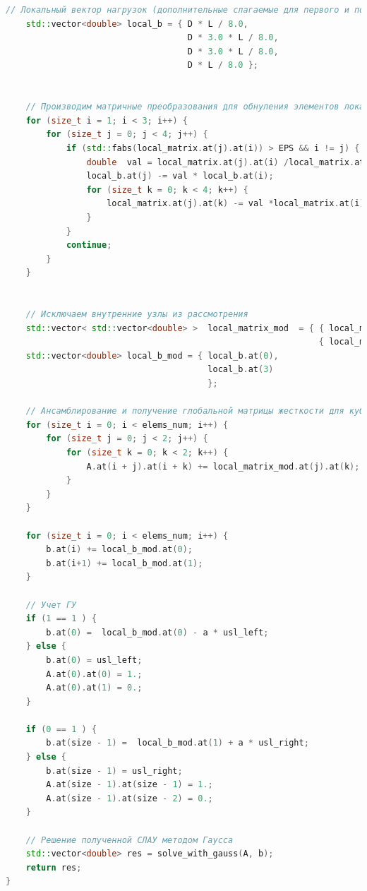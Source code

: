 \begin{lstlisting}[language=c++, label=prog,caption={\textit{Реализация МКЭ}}]
    // Локальный вектор нагрузок (дополнительные слагаемые для первого и последнего элементов учитываются далее)
    std::vector<double> local_b = { D * L / 8.0,
                                    D * 3.0 * L / 8.0,
                                    D * 3.0 * L / 8.0,
                                    D * L / 8.0 };

    
    // Производим матричные преобразования для обнуления элементов локальной матрицы жесткости, относящихся к внутренним узлам
    for (size_t i = 1; i < 3; i++) {
        for (size_t j = 0; j < 4; j++) {
            if (std::fabs(local_matrix.at(j).at(i)) > EPS && i != j) {
                double  val = local_matrix.at(j).at(i) /local_matrix.at(i).at(i);
                local_b.at(j) -= val * local_b.at(i);
                for (size_t k = 0; k < 4; k++) {
                    local_matrix.at(j).at(k) -= val *local_matrix.at(i).at(k);
                }
            }
            continue;
        }
    }
    
    
    // Исключаем внутренние узлы из рассмотрения
    std::vector< std::vector<double> >  local_matrix_mod  = { { local_matrix.at(0).at(0), local_matrix.at(0).at(3) },
                                                              { local_matrix.at(3).at(0), local_matrix.at(3).at(3) } };
    std::vector<double> local_b_mod = { local_b.at(0), 
                                        local_b.at(3)
                                        };
    
    // Ансамблирование и получение глобальной матрицы жесткости для кубического КЭ
    for (size_t i = 0; i < elems_num; i++) {
        for (size_t j = 0; j < 2; j++) {
            for (size_t k = 0; k < 2; k++) {
                A.at(i + j).at(i + k) += local_matrix_mod.at(j).at(k);
            }
        }
    }

    for (size_t i = 0; i < elems_num; i++) {
        b.at(i) += local_b_mod.at(0);
        b.at(i+1) += local_b_mod.at(1);
    }
       
    // Учет ГУ
    if (1 == 1 ) {
        b.at(0) =  local_b_mod.at(0) - a * usl_left;
    } else {
        b.at(0) = usl_left;
        A.at(0).at(0) = 1.;
        A.at(0).at(1) = 0.;
    }

    if (0 == 1 ) {
        b.at(size - 1) =  local_b_mod.at(1) + a * usl_right;
    } else {
        b.at(size - 1) = usl_right;
        A.at(size - 1).at(size - 1) = 1.;
        A.at(size - 1).at(size - 2) = 0.;
    }
    
    // Решение полученной СЛАУ методом Гаусса
    std::vector<double> res = solve_with_gauss(A, b);
    return res;
}


\end{lstlisting}
